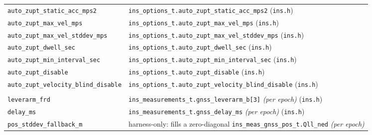 \documentclass[11pt,a4paper]{article}
\newcommand{\code}[1]{\texttt{#1}}
\begin{document}
\begin{landscape}
\begin{center}
\begin{longtable}{@{}p{6.5cm}p{16.5cm}@{}}
\code{auto\_\allowbreak{}zupt\_\allowbreak{}static\_\allowbreak{}acc\_\allowbreak{}mps2} & \code{ins\_\allowbreak{}options\_\allowbreak{}t.auto\_\allowbreak{}zupt\_\allowbreak{}static\_\allowbreak{}acc\_\allowbreak{}mps2} (\code{ins.h}) \\
\code{auto\_\allowbreak{}zupt\_\allowbreak{}max\_\allowbreak{}vel\_\allowbreak{}mps} & \code{ins\_\allowbreak{}options\_\allowbreak{}t.auto\_\allowbreak{}zupt\_\allowbreak{}max\_\allowbreak{}vel\_\allowbreak{}mps} (\code{ins.h}) \\
\code{auto\_\allowbreak{}zupt\_\allowbreak{}max\_\allowbreak{}vel\_\allowbreak{}stddev\_\allowbreak{}mps} & \code{ins\_\allowbreak{}options\_\allowbreak{}t.auto\_\allowbreak{}zupt\_\allowbreak{}max\_\allowbreak{}vel\_\allowbreak{}stddev\_\allowbreak{}mps} (\code{ins.h}) \\
\code{auto\_\allowbreak{}zupt\_\allowbreak{}dwell\_\allowbreak{}sec} & \code{ins\_\allowbreak{}options\_\allowbreak{}t.auto\_\allowbreak{}zupt\_\allowbreak{}dwell\_\allowbreak{}sec} (\code{ins.h}) \\
\code{auto\_\allowbreak{}zupt\_\allowbreak{}min\_\allowbreak{}interval\_\allowbreak{}sec} & \code{ins\_\allowbreak{}options\_\allowbreak{}t.auto\_\allowbreak{}zupt\_\allowbreak{}min\_\allowbreak{}interval\_\allowbreak{}sec} (\code{ins.h}) \\
\code{auto\_\allowbreak{}zupt\_\allowbreak{}disable} & \code{ins\_\allowbreak{}options\_\allowbreak{}t.auto\_\allowbreak{}zupt\_\allowbreak{}disable} (\code{ins.h}) \\
\code{auto\_\allowbreak{}zupt\_\allowbreak{}velocity\_\allowbreak{}blind\_\allowbreak{}disable} & \code{ins\_\allowbreak{}options\_\allowbreak{}t.auto\_\allowbreak{}zupt\_\allowbreak{}velocity\_\allowbreak{}blind\_\allowbreak{}disable} (\code{ins.h}) \\
\addlinespace
\multicolumn{2}{l}{\textbf{\code{gnss:}, aiding quality}} \\
\code{leverarm\_\allowbreak{}frd}        & \code{ins\_\allowbreak{}measurements\_\allowbreak{}t.gnss\_\allowbreak{}leverarm\_\allowbreak{}b[3]} \emph{(per epoch)} (\code{ins.h}) \\
\code{delay\_\allowbreak{}ms}            & \code{ins\_\allowbreak{}measurements\_\allowbreak{}t.gnss\_\allowbreak{}delay\_\allowbreak{}ms} \emph{(per epoch)} (\code{ins.h}) \\
\code{pos\_\allowbreak{}stddev\_\allowbreak{}fallback\_\allowbreak{}m} & harness-only: fills a zero-diagonal \code{ins\_\allowbreak{}meas\_\allowbreak{}gnss\_\allowbreak{}pos\_\allowbreak{}t.Qll\_\allowbreak{}ned} \emph{(per epoch)} \\

\end{longtable}
\end{center}
\end{landscape}
\end{document}
